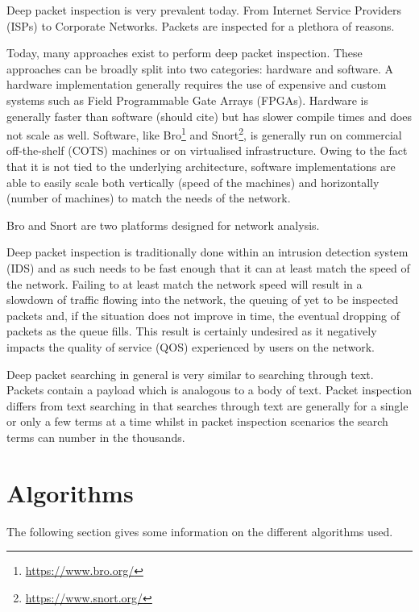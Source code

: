 \documentclass{article}
\begin{document}
Deep packet inspection is very prevalent today. From Internet Service Providers (ISPs) to Corporate Networks. Packets are inspected for a plethora of reasons. 

Today, many approaches exist to perform deep packet inspection. These approaches can be broadly split into two categories: hardware and software. A hardware implementation generally requires the use of expensive and custom systems such as Field Programmable Gate Arrays (FPGAs). Hardware is generally faster than software (should cite) but has slower compile times and does not scale as well. Software, like Bro\footnote{\url{https://www.bro.org/}} and Snort\footnote{\url{https://www.snort.org/}}, is generally run on commercial off-the-shelf (COTS) machines or on virtualised infrastructure. Owing to the fact that it is not tied to the underlying architecture, software implementations are able to easily scale both vertically (speed of the machines) and horizontally (number of machines) to match the needs of the network.

Bro and Snort are two platforms designed for network analysis.

Deep packet inspection is traditionally done within an intrusion detection system (IDS) and as such needs to be fast enough that it can at least match the speed of the network. Failing to at least match the network speed will result in a slowdown of traffic flowing into the network, the queuing of yet to be inspected packets and, if the situation does not improve in time, the eventual dropping of packets as the queue fills. This result is certainly undesired as it negatively impacts the quality of service (QOS) experienced by users on the network.  

Deep packet searching in general is very similar to searching through text. Packets contain a payload which is analogous to a body of text. Packet inspection differs from text searching in that searches through text are generally for a single or only a few terms at a time whilst in packet inspection scenarios the search terms can number in the thousands. 

\section{Algorithms} \label{algorithms}

The following section gives some information on the different algorithms used. 
\end{document}
